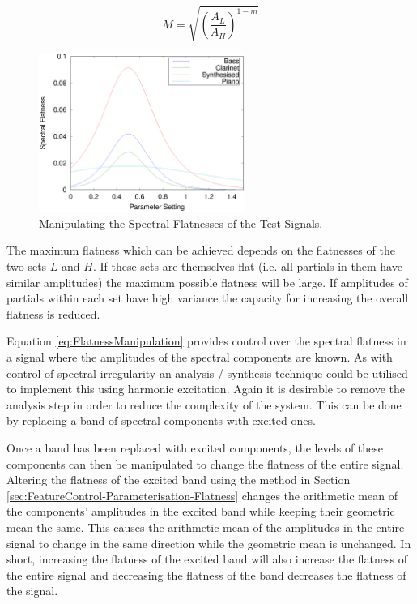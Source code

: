 			\begin{equation}
				M = \sqrt{ \left( \frac{A_L}{A_H} \right) ^{1 - m}}
				\label{eq:FlatnessControlParameter}
			\end{equation}

			\begin{figure}[h!]
				\centering
				\includegraphics[width=0.6\textwidth]{chapter6/Images/MoveFlatnesses.eps}
				\caption{Manipulating the Spectral Flatnesses of the Test Signals.}
				\label{fig:MoveFlatnesses}
			\end{figure}

			The maximum flatness which can be achieved depends on the flatnesses of the two sets $L$ and $H$.
			If these sets are themselves flat (i.e. all partials in them have similar amplitudes) the maximum
			possible flatness will be large. If amplitudes of partials within each set have high variance the
			capacity for increasing the overall flatness is reduced.

			Equation \ref{eq:FlatnessManipulation} provides control over the spectral flatness in a signal
			where the amplitudes of the spectral components are known. As with control of spectral irregularity
			an analysis / synthesis technique could be utilised to implement this using harmonic excitation.
			Again it is desirable to remove the analysis step in order to reduce the complexity of the system.
			This can be done by replacing a band of spectral components with excited ones.

			Once a band has been replaced with excited components, the levels of these components can then be
			manipulated to change the flatness of the entire signal. Altering the flatness of the excited band
			using the method in Section \ref{sec:FeatureControl-Parameterisation-Flatness} changes the
			arithmetic mean of the components' amplitudes in the excited band while keeping their geometric
			mean the same. This causes the arithmetic mean of the amplitudes in the entire signal to change in
			the same direction while the geometric mean is unchanged. In short, increasing the flatness of the
			excited band will also increase the flatness of the entire signal and decreasing the flatness of
			the band decreases the flatness of the signal.

